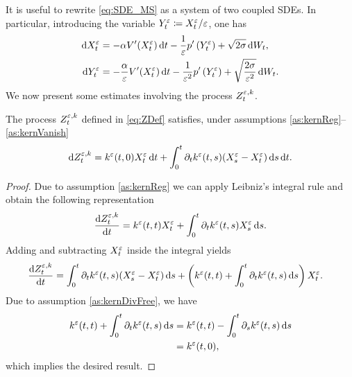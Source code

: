 \documentclass[10pt]{article}
\begin{document}
It is useful to rewrite \eqref{eq:SDE_MS} as a system of two coupled SDEs. In particular, introducing the variable $Y^\varepsilon_t \coloneqq X^\varepsilon_t / \varepsilon$, one has
\begin{equation}\label{eq:SDE_MS2}
\begin{aligned}
	\mathrm{d} X_t^\varepsilon &= -\alpha V'(X_t^\varepsilon) \,\mathrm{d} t - \frac1{\varepsilon} p'\left(Y_t^\varepsilon\right) + \sqrt{2\sigma} \,\mathrm{d} W_t, \\
	\mathrm{d} Y_t^\varepsilon &= -\frac{\alpha}{\varepsilon} V'(X_t^\varepsilon) \,\mathrm{d} t - \frac1{\varepsilon^2} p'\left(Y^\varepsilon_t\right) + \sqrt{\frac{2\sigma}{\varepsilon^2}} \,\mathrm{d} W_t.
\end{aligned}
\end{equation}
We now present some estimates involving the process $Z_t^{\varepsilon, k}$.
\begin{lemma}\label{lem:ZRewriting} The process $Z_t^{\varepsilon, k}$ defined in \eqref{eq:ZDef} satisfies, under assumptions \ref{as:kernReg}--\ref{as:kernVanish}
	\begin{equation}
	\mathrm{d} Z_t^{\varepsilon, k} = k^\varepsilon(t, 0) X^\varepsilon_t \,\mathrm{d} t + \int_0^t \partial_t k^\varepsilon(t, s) (X^\varepsilon_s - X^\varepsilon_t) \,\mathrm{d} s \,\mathrm{d} t.
	\end{equation}
\end{lemma}
\begin{proof} Due to assumption \ref{as:kernReg} we can apply Leibniz's integral rule and obtain the following representation
	\begin{equation}
	\frac{\mathrm{d} Z^{\varepsilon,k}_t}{\mathrm{d} t} = k^\varepsilon(t, t)X^\varepsilon_t + \int_0^t \partial_t k^\varepsilon(t, s) X^\varepsilon_s \,\mathrm{d} s.
	\end{equation}
	Adding and subtracting $X_t^\varepsilon$ inside the integral yields
	\begin{equation}
	\begin{aligned}
	\frac{\mathrm{d} Z^{\varepsilon,k}_t}{\mathrm{d} t} &= \int_0^t \partial_t k^\varepsilon(t, s) (X^\varepsilon_s - X^\varepsilon_t) \,\mathrm{d} s + \left(k^\varepsilon(t, t) + \int_0^t \partial_t k^\varepsilon(t, s) \,\mathrm{d} s\right)X^\varepsilon_t.
	\end{aligned}
	\end{equation}
	Due to assumption \ref{as:kernDivFree}, we have
	\begin{equation}
	\begin{aligned}
	k^\varepsilon(t, t) + \int_0^t \partial_t k^\varepsilon(t, s) \,\mathrm{d} s &= k^\varepsilon(t, t) - \int_0^t \partial_s k^\varepsilon(t, s) \,\mathrm{d} s\\
	&= k^\varepsilon(t, 0),
	\end{aligned}
	\end{equation}
	which implies the desired result.
\end{proof}
\end{document}

